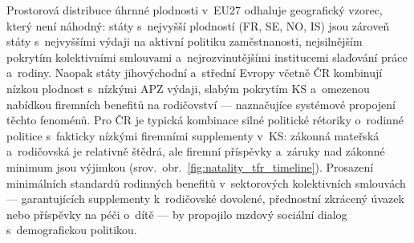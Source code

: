 Prostorová distribuce úhrnné plodnosti v~EU27 odhaluje geografický vzorec, který není náhodný: státy s~nejvyšší plodností (FR, SE, NO, IS) jsou zároveň státy s~nejvyššími výdaji na aktivní politiku zaměstnanosti, nejsilnějším pokrytím kolektivními smlouvami a~nejrozvinutějšími institucemi slaďování práce a~rodiny.
Naopak státy jihovýchodní a~střední Evropy včetně ČR kombinují nízkou plodnost s~nízkými \ac{APZ} výdaji, slabým pokrytím \ac{KS} a~omezenou nabídkou firemních benefitů na rodičovství --- naznačujíce systémové propojení těchto fenoménů.
Pro ČR je typická kombinace silné politické rétoriky o~rodinné politice s~fakticky nízkými firemními supplementy v~\ac{KS}: zákonná mateřská a~rodičovská je relativně štědrá, ale firemní příspěvky a~záruky nad zákonné minimum jsou výjimkou (srov.~obr.~\ref{fig:natality_tfr_timeline}).
Prosazení minimálních standardů rodinných benefitů v~sektorových kolektivních smlouvách --- garantujících supplementy k~rodičovské dovolené, přednostní zkrácený úvazek nebo příspěvky na péči o~dítě --- by propojilo mzdový sociální dialog s~demografickou politikou.



